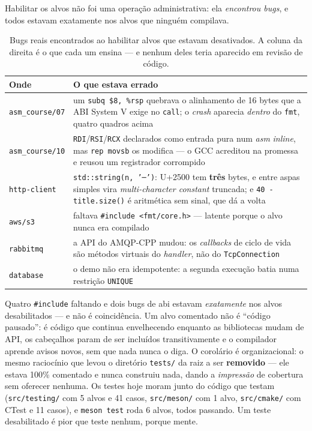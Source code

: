 Habilitar os alvos não foi uma operação administrativa: ela \emph{encontrou
bugs}, e todos estavam exatamente nos alvos que ninguém compilava.

\begin{table}[htbp]
\centering
\caption{Bugs reais encontrados ao habilitar alvos que estavam desativados. A
         coluna da direita é o que cada um ensina --- e nenhum deles teria
         aparecido em revisão de código.}
\label{tab:bugs-latentes}
\footnotesize
\begin{tabular}{@{}lp{}@{}}
\toprule
\textbf{Onde} & \textbf{O que estava errado} \\
\midrule
\texttt{asm\_course/07} & um \texttt{subq \$8, \%rsp} quebrava o alinhamento de 16 bytes que a ABI System V exige no \texttt{call}; o \emph{crash} aparecia \emph{dentro} do \texttt{fmt}, quatro quadros acima \\
\texttt{asm\_course/10} & \texttt{RDI}/\texttt{RSI}/\texttt{RCX} declarados como entrada pura num \emph{asm} \emph{inline}, mas \texttt{rep movsb} os modifica --- o GCC acreditou na promessa e reusou um registrador corrompido \\
\texttt{http-client}    & \texttt{std::string(n, '─')}: U+2500 tem \textbf{três} bytes, e entre aspas simples vira \emph{multi-character constant} truncada; e \texttt{40 - title.size()} é aritmética sem sinal, que dá a volta \\
\texttt{aws/s3}         & faltava \texttt{\#include <fmt/core.h>} --- latente porque o alvo nunca era compilado \\
\texttt{rabbitmq}       & a API do AMQP-CPP mudou: os \emph{callbacks} de ciclo de vida são métodos virtuais do \emph{handler}, não do \texttt{TcpConnection} \\
\texttt{database}       & o demo não era idempotente: a segunda execução batia numa restrição \texttt{UNIQUE} \\
\bottomrule
\end{tabular}
\end{table}

\begin{regra}
Quatro \texttt{\#include} faltando e dois bugs de \gls{abi} estavam
\emph{exatamente} nos alvos desabilitados --- e não é coincidência. Um alvo
comentado não é ``código pausado'': é código que continua envelhecendo enquanto
as bibliotecas mudam de API, os cabeçalhos param de ser incluídos
transitivamente e o compilador aprende avisos novos, sem que nada nunca o diga.
O corolário é organizacional: o mesmo raciocínio que levou o diretório
\texttt{tests/} da raiz a ser \textbf{removido} --- ele estava 100\%
comentado e nunca construiu nada, dando a \emph{impressão} de cobertura sem
oferecer nenhuma. Os testes hoje moram junto do código que testam
(\texttt{src/testing/} com 5 alvos e 41 casos, \texttt{src/meson/} com 1 alvo,
\texttt{src/cmake/} com CTest e 11 casos), e \texttt{meson test} roda 6 alvos,
todos passando. Um teste desabilitado é pior que teste nenhum, porque mente.
\end{regra}

